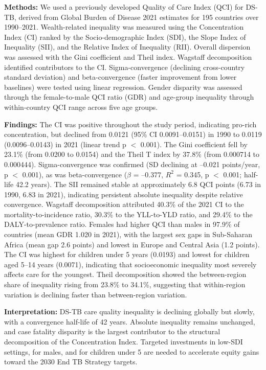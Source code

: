 \documentclass[12pt]{article}
\begin{document}
\textbf{Methods:} We used a previously developed Quality of Care Index (QCI) for DS-TB, derived from Global Burden of Disease 2021 estimates for 195 countries over 1990--2021. Wealth-related inequality was measured using the Concentration Index (CI) ranked by the Socio-demographic Index (SDI), the Slope Index of Inequality (SII), and the Relative Index of Inequality (RII). Overall dispersion was assessed with the Gini coefficient and Theil index. Wagstaff decomposition identified contributors to the CI. Sigma-convergence (declining cross-country standard deviation) and beta-convergence (faster improvement from lower baselines) were tested using linear regression. Gender disparity was assessed through the female-to-male QCI ratio (GDR) and age-group inequality through within-country QCI range across five age groups.

\textbf{Findings:} The CI was positive throughout the study period, indicating pro-rich concentration, but declined from 0.0121 (95\% CI 0.0091--0.0151) in 1990 to 0.0119 (0.0096--0.0143) in 2021 (linear trend p $<$ 0.001). The Gini coefficient fell by 23.1\% (from 0.0200 to 0.0154) and the Theil T index by 37.8\% (from 0.000714 to 0.000444). Sigma-convergence was confirmed (SD declining at --0.021 points/year, p $<$ 0.001), as was beta-convergence ($\beta$ = --0.377, $R^2$ = 0.345, p $<$ 0.001; half-life 42.2 years). The SII remained stable at approximately 6.8 QCI points (6.73 in 1990, 6.83 in 2021), indicating persistent absolute inequality despite relative convergence. Wagstaff decomposition attributed 40.3\% of the 2021 CI to the mortality-to-incidence ratio, 30.3\% to the YLL-to-YLD ratio, and 29.4\% to the DALY-to-prevalence ratio. Females had higher QCI than males in 97.9\% of countries (mean GDR 1.020 in 2021), with the largest sex gaps in Sub-Saharan Africa (mean gap 2.6 points) and lowest in Europe and Central Asia (1.2 points). The CI was highest for children under 5 years (0.0193) and lowest for children aged 5--14 years (0.0071), indicating that socioeconomic inequality most severely affects care for the youngest. Theil decomposition showed the between-region share of inequality rising from 23.8\% to 34.1\%, suggesting that within-region variation is declining faster than between-region variation.

\textbf{Interpretation:} DS-TB care quality inequality is declining globally but slowly, with a convergence half-life of 42 years. Absolute inequality remains unchanged, and case fatality disparity is the largest contributor to the structural decomposition of the Concentration Index. Targeted investments in low-SDI settings, for males, and for children under 5 are needed to accelerate equity gains toward the 2030 End TB Strategy targets.
\end{document}
